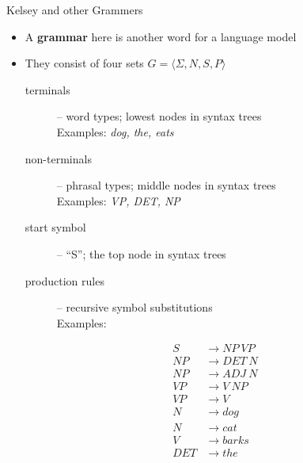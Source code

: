 \documentclass[xcolor=pdftex,x11names,table,hyperref]{beamer}
\newcommand{\detail}[1]{{\color{lightgrey}\small{}#1}}
\begin{document}
\begin{frame}{Kelsey and other Grammers}
\begin{itemize}
	\item A \textbf{grammar} here is another word for a language model
	\item They consist of four sets \detail{$G = \langle \Sigma, N, S, P \rangle$}
		\begin{description}
			\item[terminals] -- word types; lowest nodes in syntax trees \\ Examples: \textit{dog, the, eats}
			\item[non-terminals] -- phrasal types;  middle nodes in syntax trees \\ Examples: \textit{VP, DET, NP}
			\item[start symbol] -- ``S''; the top node in syntax trees
			\pause
		\item[production rules] -- recursive symbol substitutions \\ Examples:
		\end{description}
		\vspace{-1.0em}
		\begin{footnotesize}
		\begin{spacing}{0.6}
		\begin{align*}
			S & \rightarrow NP \ VP \\
			NP & \rightarrow DET \ N \\
			NP & \rightarrow ADJ \ N \\
			VP & \rightarrow V \ NP \\
			VP & \rightarrow V \\
			N & \rightarrow dog \\
			N & \rightarrow cat \\
			V & \rightarrow barks \\
			DET & \rightarrow the \\
		\end{align*}
		\end{spacing}
		\end{footnotesize}
\end{itemize}
\end{frame}
\end{document}
